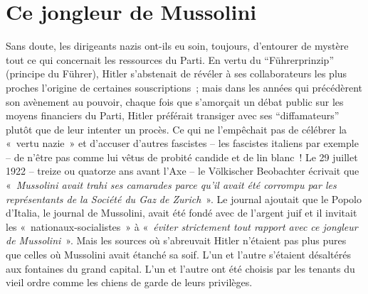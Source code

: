 \documentclass[french,twoside]{book} %
\begin{document}
\section[Ce jongleur de Mussolini]{Ce jongleur de Mussolini}
\noindent Sans doute, les dirigeants nazis ont-ils eu soin, toujours, d’entourer de mystère tout ce qui concernait les ressources du Parti. En vertu du “Führerprinzip” (principe du Führer), Hitler s’abstenait de révéler à ses collaborateurs les plus proches l’origine de certaines souscriptions ; mais dans les années qui précédèrent son avènement au pouvoir, chaque fois que s’amorçait un débat public sur les moyens financiers du Parti, Hitler préférait transiger avec ses “diffamateurs” plutôt que de leur intenter un procès. Ce qui ne l’empêchait pas de célébrer la « vertu nazie » et d’accuser d’autres fascistes – les fascistes italiens par exemple – de n’être pas comme lui vêtus de probité candide et de lin blanc ! Le 29 juillet 1922 – treize ou quatorze ans avant l’Axe – le Völkischer Beobachter écrivait que « \emph{Mussolini avait trahi ses camarades parce qu’il avait été corrompu par les représentants de la Société du Gaz de Zurich} ». Le journal ajoutait que le Popolo d’Italia, le journal de Mussolini, avait été fondé avec de l’argent juif et il invitait les « nationaux-socialistes » à « \emph{éviter strictement tout rapport avec ce jongleur de Mussolini} ». Mais les sources où s’abreuvait Hitler n’étaient pas plus pures que celles où Mussolini avait étanché sa soif. L’un et l’autre s’étaient désaltérés aux fontaines du grand capital. L’un et l’autre ont été choisis par les tenants du vieil ordre comme les chiens de garde de leurs privilèges.
\end{document}
